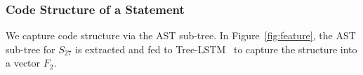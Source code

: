 





\vspace{-1pt}
\subsubsection{Code Structure of a Statement}

We capture code structure via the AST sub-tree.
In Figure~\ref{fig:feature}, the AST sub-tree for $S_{27}$ is
extracted and fed to Tree-LSTM~\cite{tai2015improved} to capture the
structure into a vector $F_2$.



